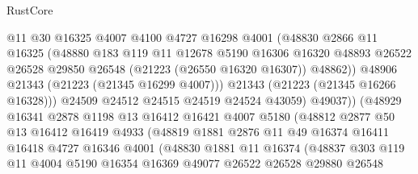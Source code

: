 \begin{lexlean}{RustCore}
\begin{coremodule}
                          @11
                          @30
                          @16325
                          @4007
                          @4100
                          @4727
                          @16298
                          @4001
                          (@48830
                            @2866
                            @11
                            @16325
                            (@48880
                              @183
                              @119
                              @11
                              @12678
                              @5190
                              @16306
                              @16320
                              @48893
                              @26522
                              @26528
                              @29850
                              @26548
                              (@21223 (@26550 @16320 @16307))
                              @48862))
                          @48906
                          @21343
                          (@21223 (@21345 @16299 @4007)))
                        @21343
                        (@21223 (@21345 @16266 @16328)))
                      @24509
                      @24512
                      @24515
                      @24519
                      @24524
                      @43059)
                    @49037))
                (@48929
                  @16341
                  @2878
                  @1198
                  @13
                  @16412
                  @16421
                  @4007
                  @5180
                  (@48812
                    @2877
                    @50
                    @13
                    @16412
                    @16419
                    @4933
                    (@48819
                      @1881
                      @2876
                      @11
                      @49
                      @16374
                      @16411
                      @16418
                      @4727
                      @16346
                      @4001
                      (@48830
                        @1881
                        @11
                        @16374
                        (@48837
                          @303
                          @119
                          @11
                          @4004
                          @5190
                          @16354
                          @16369
                          @49077
                          @26522
                          @26528
                          @29880
                          @26548

\end{coremodule}
\end{lexlean}
